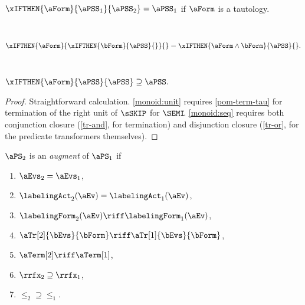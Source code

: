 \begin{lemma}
\begin{enumerate*}[label=(\alph*),ref=\alph*]
  \\\item \label{monoid:if:dead}
    \begin{math}
      \xIFTHEN{\aForm}{\aPSS_1}{\aPSS_2}
      =
      \aPSS_1
    \end{math}
    if $\aForm$ is a tautology.

  \\\item \label{monoid:if:if}
    \begin{math}
      \xIFTHEN{\aForm}{
        \xIFTHEN{\bForm}{\aPSS}{}
      }{}
      =
      \xIFTHEN{\aForm\land\bForm}{\aPSS}{}.
    \end{math}

  \\\item \label{monoid:if:elim}
    \begin{math}
      \xIFTHEN{\aForm}{\aPSS}{\aPSS}
      \supseteq
      \aPSS.
    \end{math}
  \end{enumerate*}      
  \vspace{-.5\baselineskip}
  \begin{proof}
    Straightforward calculation.
    \eqref{monoid:unit} requires \ref{pom-term-tau} for
    termination of the right
    unit of $\sSKIP$ for $\SEMI\!$.
    \eqref{monoid:seq} requires both
    conjunction closure (\ref{tr-and}, for termination) and disjunction
    closure (\ref{tr-or}, for the predicate transformers themselves).  
  \end{proof}
\end{lemma}
\begin{definition}
  \label{def:augment}
  $\aPS_2$ is an \emph{augment} of $\aPS_1$ if
  \begin{multicols}{4}
    \begin{enumerate}
    \item $\aEvs_2=\aEvs_1$,
    \item $\labelingAct_2(\aEv)=\labelingAct_1(\aEv)$,
    \item $\labelingForm_2(\aEv) \riff \labelingForm_1(\aEv)$,
    \item $\aTr[2]{\bEvs}{\bForm}\riff \aTr[1]{\bEvs}{\bForm}$,
    \item $\aTerm[2] \riff \aTerm[1]$,
    \item ${\rrfx_2}\supseteq{\rrfx_1}$,
    \item ${\le_2}\supseteq{\le_1}$.
    \end{enumerate}
  \end{multicols}
\end{definition}
